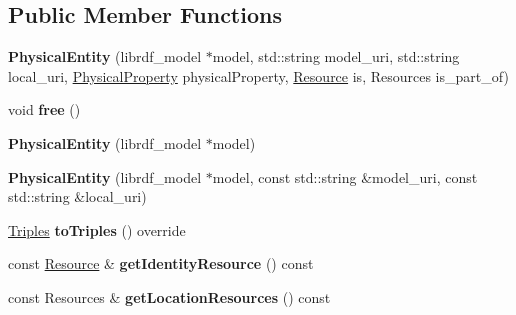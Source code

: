 \subsection*{Public Member Functions}
\begin{DoxyCompactItemize}
\item 
\mbox{\label{classomexmeta_1_1PhysicalEntity_a0341918665af91cacdb4481d037c42d2}} 
{\bfseries Physical\+Entity} (librdf\+\_\+model $\ast$model, std\+::string model\+\_\+uri, std\+::string local\+\_\+uri, \hyperlink{classomexmeta_1_1PhysicalProperty}{Physical\+Property} physical\+Property, \hyperlink{classomexmeta_1_1Resource}{Resource} is, Resources is\+\_\+part\+\_\+of)
\item 
\mbox{\label{classomexmeta_1_1PhysicalEntity_a6fd4acd7255a01322c4a53d3e84df0ba}} 
void {\bfseries free} ()
\item 
\mbox{\label{classomexmeta_1_1PhysicalEntity_a6bbbce71778e374de7d4e5e2e674fc2b}} 
{\bfseries Physical\+Entity} (librdf\+\_\+model $\ast$model)
\item 
\mbox{\label{classomexmeta_1_1PhysicalEntity_a5f583e60ad44bbb3dfcd11fdc6bc72cc}} 
{\bfseries Physical\+Entity} (librdf\+\_\+model $\ast$model, const std\+::string \&model\+\_\+uri, const std\+::string \&local\+\_\+uri)
\item 
\mbox{\label{classomexmeta_1_1PhysicalEntity_a51f5df8b2e8a1d65e5aa0d10e53b77ba}} 
\hyperlink{classomexmeta_1_1Triples}{Triples} {\bfseries to\+Triples} () override
\item 
\mbox{\label{classomexmeta_1_1PhysicalEntity_ae4b3374e9ebb817eb63f9105b491e958}} 
const \hyperlink{classomexmeta_1_1Resource}{Resource} \& {\bfseries get\+Identity\+Resource} () const
\item 
\mbox{\label{classomexmeta_1_1PhysicalEntity_a3e2fba07a4622db0180650d24bf263d9}} 
const Resources \& {\bfseries get\+Location\+Resources} () const
\item 
\mbox{\label{classomexmeta_1_1PhysicalEntity_a5d7168c527d2dbdacd612de37aa9a605}} 

\end{DoxyCompactItemize}
